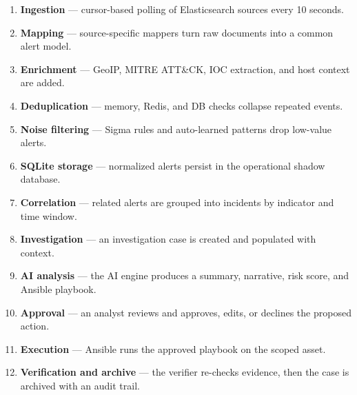 \begin{enumerate}[leftmargin=1cm]
\item \textbf{Ingestion} --- cursor-based polling of Elasticsearch sources every 10 seconds.
\item \textbf{Mapping} --- source-specific mappers turn raw documents into a common alert model.
\item \textbf{Enrichment} --- GeoIP, MITRE ATT\&CK, IOC extraction, and host context are added.
\item \textbf{Deduplication} --- memory, Redis, and DB checks collapse repeated events.
\item \textbf{Noise filtering} --- Sigma rules and auto-learned patterns drop low-value alerts.
\item \textbf{SQLite storage} --- normalized alerts persist in the operational shadow database.
\item \textbf{Correlation} --- related alerts are grouped into incidents by indicator and time window.
\item \textbf{Investigation} --- an investigation case is created and populated with context.
\item \textbf{AI analysis} --- the AI engine produces a summary, narrative, risk score, and Ansible playbook.
\item \textbf{Approval} --- an analyst reviews and approves, edits, or declines the proposed action.
\item \textbf{Execution} --- Ansible runs the approved playbook on the scoped asset.
\item \textbf{Verification and archive} --- the verifier re-checks evidence, then the case is archived with an audit trail.
\end{enumerate}

